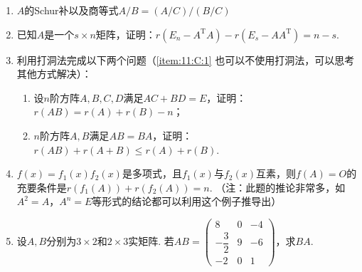 \begin{enumerate}
    \item $A$的Schur补以及商等式$A/B=(A/C)/(B/C)$%

    \item 已知$A$是一个$s \times n$矩阵，证明：$r(E_n-A^\mathrm{T}A)-r(E_s-AA^\mathrm{T})=n-s$.

    \item 利用打洞法完成以下两个问题（\ref*{item:11:C:1} 也可以不使用打洞法，可以思考其他方式解决）：
          \begin{enumerate}
              \item 设$n$阶方阵$A,B,C,D$满足$AC+BD=E$，证明：$r(AB) = r(A)+r(B)-n$；

              \item \label{item:11:C:1}
                    $n$阶方阵$A,B$满足$AB=BA$，证明：$r(AB)+r(A+B)\leqslant r(A)+r(B)$.
          \end{enumerate}

    \item $f(x)=f_1(x)f_2(x)$是多项式，且$f_1(x)$与$f_2(x)$互素，则$f(A)=O$的充要条件是$r(f_1(A))+r(f_2(A))=n$. （注：此题的推论非常多，如$A^2=A$，$A^n=E$等形式的结论都可以利用这个例子推导出）

    \item 设$A,B$分别为$3 \times 2$和$2 \times 3$实矩阵. 若$AB=\begin{pmatrix}
                  8             & 0 & -4 \\[1ex]
                  -\dfrac{3}{2} & 9 & -6 \\[1ex]
                  -2            & 0 & 1
              \end{pmatrix}$，求$BA$.
\end{enumerate}
